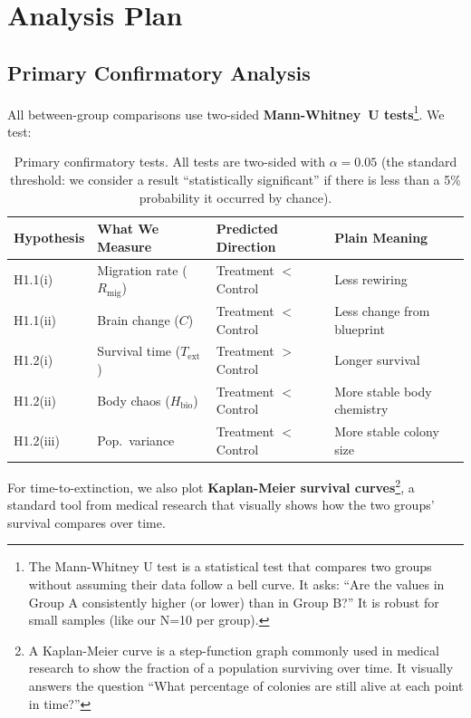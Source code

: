 \documentclass[12pt, a4paper]{article}
\newcommand{\Hbio}{H_{\mathrm{bio}}}
\newcommand{\Rmig}{R_{\mathrm{mig}}}
\begin{document}
\section{Analysis Plan}
\label{sec:analysis}

\subsection{Primary Confirmatory Analysis}

All between-group comparisons use two-sided \textbf{Mann-Whitney~U tests}\footnote{The Mann-Whitney U test is a statistical test that compares two groups without assuming their data follow a bell curve. It asks: ``Are the values in Group A consistently higher (or lower) than in Group B?'' It is robust for small samples (like our N=10 per group).}. We test:

\begin{table}[H]
\centering
\caption{Primary confirmatory tests. All tests are two-sided with $\alpha = 0.05$ (the standard threshold: we consider a result ``statistically significant'' if there is less than a 5\% probability it occurred by chance).}
\label{tab:tests}
\begin{tabular}{@{}llll@{}}
\toprule
\textbf{Hypothesis} & \textbf{What We Measure} & \textbf{Predicted Direction} & \textbf{Plain Meaning} \\
\midrule
H1.1(i)   & Migration rate ($\Rmig$)        & Treatment $<$ Control & Less rewiring \\
H1.1(ii)  & Brain change ($C$)              & Treatment $<$ Control & Less change from blueprint \\
H1.2(i)   & Survival time ($T_{\text{ext}}$) & Treatment $>$ Control & Longer survival \\
H1.2(ii)  & Body chaos ($\Hbio$)            & Treatment $<$ Control & More stable body chemistry \\
H1.2(iii) & Pop.\ variance                  & Treatment $<$ Control & More stable colony size \\
\bottomrule
\end{tabular}
\end{table}

\noindent For time-to-extinction, we also plot \textbf{Kaplan-Meier survival curves}\footnote{A Kaplan-Meier curve is a step-function graph commonly used in medical research to show the fraction of a population surviving over time. It visually answers the question ``What percentage of colonies are still alive at each point in time?''}, a standard tool from medical research that visually shows how the two groups' survival compares over time.
\end{document}
